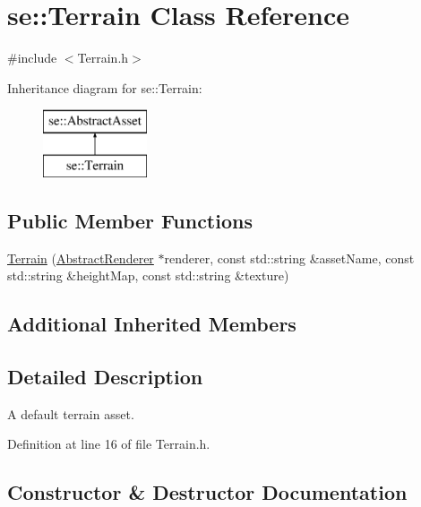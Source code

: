 \hypertarget{classse_1_1_terrain}{}\section{se\+:\+:Terrain Class Reference}
\label{classse_1_1_terrain}


{\ttfamily \#include $<$Terrain.\+h$>$}

Inheritance diagram for se\+:\+:Terrain\+:\begin{figure}[H]
\begin{center}
\leavevmode
\includegraphics[height=2.000000cm]{classse_1_1_terrain}
\end{center}
\end{figure}
\subsection*{Public Member Functions}
\begin{DoxyCompactItemize}
\item 
\mbox{\hyperlink{classse_1_1_terrain_a0e20b4b0333c3d92bfe143bf3cc17b2a}{Terrain}} (\mbox{\hyperlink{classse_1_1_abstract_renderer}{Abstract\+Renderer}} $\ast$renderer, const std\+::string \&asset\+Name, const std\+::string \&height\+Map, const std\+::string \&texture)
\end{DoxyCompactItemize}
\subsection*{Additional Inherited Members}


\subsection{Detailed Description}
A default terrain asset. 

Definition at line 16 of file Terrain.\+h.



\subsection{Constructor \& Destructor Documentation}
\mbox{\label{classse_1_1_terrain_a0e20b4b0333c3d92bfe143bf3cc17b2a}} 
